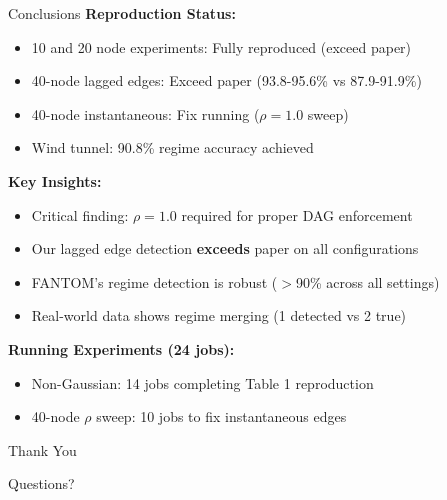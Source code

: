 \documentclass[aspectratio=169]{beamer}
\begin{document}
\begin{frame}{Conclusions}
\textbf{Reproduction Status:}
\begin{itemize}
    \item \textcolor{reprogreen}{10 and 20 node experiments: Fully reproduced (exceed paper)}
    \item \textcolor{reprogreen}{40-node lagged edges: Exceed paper (93.8-95.6\% vs 87.9-91.9\%)}
    \item \textcolor{warnred}{40-node instantaneous: Fix running ($\rho=1.0$ sweep)}
    \item \textcolor{reprogreen}{Wind tunnel: 90.8\% regime accuracy achieved}
\end{itemize}

\vspace{0.3cm}
\textbf{Key Insights:}
\begin{itemize}
    \item Critical finding: $\rho=1.0$ required for proper DAG enforcement
    \item Our lagged edge detection \textbf{exceeds} paper on all configurations
    \item FANTOM's regime detection is robust ($>$90\% across all settings)
    \item Real-world data shows regime merging (1 detected vs 2 true)
\end{itemize}

\vspace{0.3cm}
\textbf{Running Experiments (24 jobs):}
\begin{itemize}
    \item Non-Gaussian: 14 jobs completing Table 1 reproduction
    \item 40-node $\rho$ sweep: 10 jobs to fix instantaneous edges
\end{itemize}
\end{frame}

\begin{frame}
\centering
\Huge Thank You

\vspace{1cm}
\Large Questions?
\end{frame}
\end{document}
